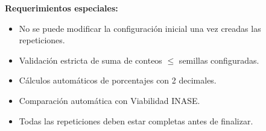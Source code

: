 \vspace{0.5em}
\noindent\textbf{Requerimientos especiales:}
\begin{itemize}[nosep]
    \item No se puede modificar la configuración inicial una vez creadas las repeticiones.
    \item Validación estricta de suma de conteos $\leq$ semillas configuradas.
    \item Cálculos automáticos de porcentajes con 2 decimales.
    \item Comparación automática con Viabilidad INASE.
    \item Todas las repeticiones deben estar completas antes de finalizar.
\end{itemize}
